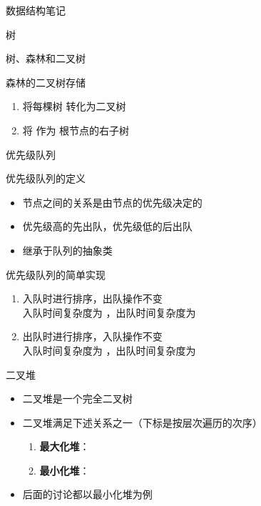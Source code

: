 \documentclass[
  ignorenonframetext,
]{beamer}
\providecommand{\tightlist}{%
  \setlength{\itemsep}{0pt}\setlength{\parskip}{0pt}}
\begin{document}
\begin{frame}[fragile]{数据结构笔记}
\begin{block}{树}
\begin{block}{树、森林和二叉树}
\begin{block}{森林的二叉树存储}
\protect{}\label{ux68eeux6797ux7684ux4e8cux53c9ux6811ux5b58ux50a8}
\begin{enumerate}
\tightlist
\item
  将每棵树 {} 转化为二叉树 {}
\item
  将 {} 作为 {} 根节点的右子树
\end{enumerate}
\end{block}
\end{block}
\end{block}

\begin{block}{优先级队列}
\protect{}\label{ux4f18ux5148ux7ea7ux961fux5217}
\begin{block}{优先级队列的定义}
\protect{}\label{ux4f18ux5148ux7ea7ux961fux5217ux7684ux5b9aux4e49}
\begin{itemize}
\tightlist
\item
  节点之间的关系是由节点的优先级决定的
\item
  优先级高的先出队，优先级低的后出队
\item
  继承于队列的抽象类
\end{itemize}
\end{block}

\begin{block}{优先级队列的简单实现}
\protect{}\label{ux4f18ux5148ux7ea7ux961fux5217ux7684ux7b80ux5355ux5b9eux73b0}
\begin{enumerate}
\tightlist
\item
  入队时进行排序，出队操作不变\\
  入队时间复杂度为 {}，出队时间复杂度为 {}
\item
  出队时进行排序，入队操作不变\\
  入队时间复杂度为 {}，出队时间复杂度为 {}
\end{enumerate}
\end{block}

\begin{block}{二叉堆}
\protect{}\label{ux4e8cux53c9ux5806}
\begin{itemize}
\tightlist
\item
  二叉堆是一个完全二叉树
\item
  二叉堆满足下述关系之一（下标是按层次遍历的次序）

  \begin{enumerate}
  \tightlist
  \item
    \textbf{最大化堆}：{}
  \item
    \textbf{最小化堆}：{}
  \end{enumerate}
\item
  后面的讨论都以最小化堆为例
\end{itemize}



\end{block}
\end{block}
\end{frame}
\end{document}

